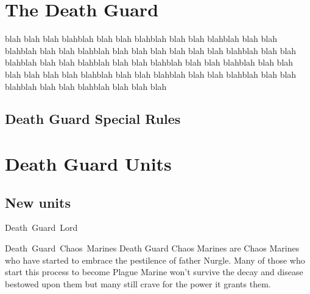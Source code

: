 \documentclass[a4paper, twocolumn]{article}
\begin{document}

\section{The Death Guard}
blah blah blah blahblah blah blah blahblah blah blah blahblah blah blah blahblah blah blah blahblah blah blah blah
blah blah blah blahblah blah blah blahblah blah blah blahblah blah blah blahblah blah blah blahblah blah blah blah
blah blah blah blahblah blah blah blahblah blah blah blahblah blah blah blahblah blah blah blahblah blah blah blah

\subsection{Death Guard Special Rules}

%
\clearpage \onecolumn
\section{Death Guard Units}

\subsection{New units}

\unit{Death Guard Lord}{}
\statsEND

\unit{Death Guard Chaos Marines}{
  Death Guard Chaos Marines are Chaos Marines who have started to embrace the pestilence of father Nurgle. Many of
  those who start this process to become Plague Marine won't survive the decay and disease bestowed upon them
  but many still crave for the power it grants them.
}
\statsEND
\end{document}
